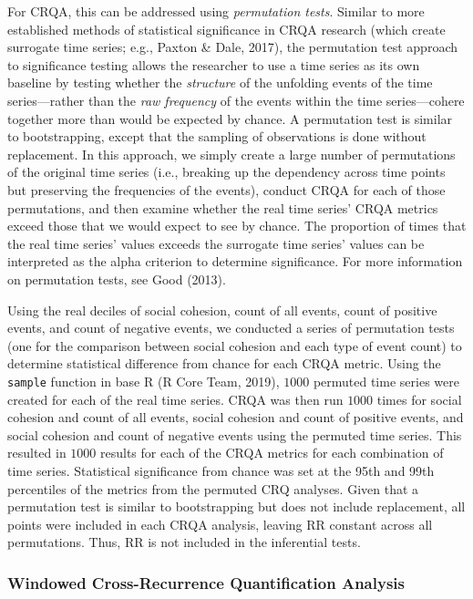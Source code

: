 \documentclass[
  english,
  man]{apa6}
\begin{document}
For CRQA, this can be addressed using \emph{permutation tests}. Similar to more
established methods of statistical significance in CRQA research (which create
surrogate time series; e.g., Paxton \& Dale, 2017), the permutation test
approach to significance testing allows the researcher to use a time series as
its own baseline by testing whether the \emph{structure} of the unfolding events of
the time series---rather than the \emph{raw frequency} of the events within the time
series---cohere together more than would be expected by chance. A permutation
test is similar to bootstrapping, except that the sampling of observations is
done without replacement. In this approach, we simply create a large number of
permutations of the original time series (i.e., breaking up the dependency
across time points but preserving the frequencies of the events), conduct CRQA
for each of those permutations, and then examine whether the real time series'
CRQA metrics exceed those that we would expect to see by chance. The proportion
of times that the real time series' values exceeds the surrogate time series'
values can be interpreted as the alpha criterion to determine significance. For
more information on permutation tests, see Good (2013).

Using the real deciles of social cohesion, count of all events, count of
positive events, and count of negative events, we conducted a series of
permutation tests (one for the comparison between social cohesion and each type
of event count) to determine statistical difference from chance for each CRQA
metric. Using the \texttt{sample} function in base R (R Core Team, 2019), \(1000\) permuted time
series were created for each of the real time series. CRQA was then run \(1000\)
times for social cohesion and count of all events, social cohesion and count of
positive events, and social cohesion and count of negative events using the
permuted time series. This resulted in \(1000\) results for each of the CRQA
metrics for each combination of time series. Statistical significance from
chance was set at the 95th and 99th percentiles of the metrics from the permuted
CRQ analyses. Given that a permutation test is similar to bootstrapping but does
not include replacement, all points were included in each CRQA analysis, leaving
RR constant across all permutations. Thus, RR is not included in the inferential
tests.

\hypertarget{windowed-cross-recurrence-quantification-analysis}{%
\subsubsection{Windowed Cross-Recurrence Quantification Analysis}\label{windowed-cross-recurrence-quantification-analysis}}
\end{document}
